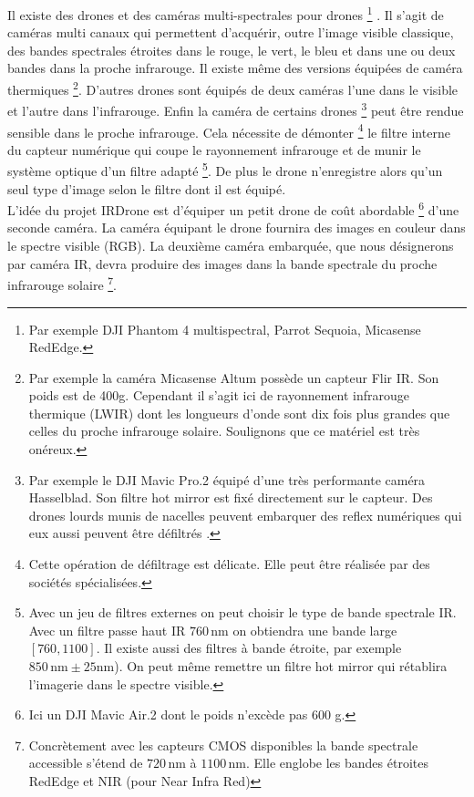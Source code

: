\documentclass[a4paper,11pt]{report}
\begin{document}
Il existe des drones et des caméras multi-spectrales pour drones
\footnote{Par exemple DJI Phantom 4 multispectral, Parrot Sequoia, Micasense RedEdge.} . 
Il s'agit de caméras multi canaux  qui permettent d'acquérir, outre l'image visible classique, des bandes spectrales étroites dans le rouge, le vert, le bleu et dans une ou deux bandes dans la proche infrarouge. Il existe même des versions équipées de caméra thermiques \footnote{Par exemple la caméra Micasense Altum  possède un capteur Flir IR. Son poids est de 400g. Cependant il s'agit ici de rayonnement infrarouge thermique (LWIR) dont les longueurs d'onde sont dix fois plus grandes que celles du  proche infrarouge solaire.  Soulignons que ce matériel est très onéreux.}.
D'autres drones
sont équipés de deux caméras l'une dans le visible et l'autre dans l'infrarouge. 
Enfin la caméra de certains drones
\footnote{Par exemple le DJI Mavic Pro.2 équipé d'une très performante caméra Hasselblad. Son filtre \og hot mirror\fg{} est fixé directement sur le capteur. Des drones \og lourds\fg{} munis de nacelles peuvent embarquer des reflex numériques qui eux aussi peuvent être \og défiltrés \fg{}. }  
peut être rendue sensible dans le proche infrarouge. Cela nécessite de démonter
\footnote{Cette opération de \og défiltrage \fg est délicate. Elle peut être réalisée par des sociétés spécialisées.} le filtre interne du capteur numérique qui coupe le rayonnement infrarouge et de munir le système optique d'un filtre adapté
\footnote{Avec un jeu de filtres externes on peut choisir le type de bande spectrale IR. Avec un filtre passe haut IR $760\,\mathrm{nm}$ on obtiendra une bande large $[760, 1100]$. Il existe aussi des filtres à bande étroite, par exemple $850\,\mathrm{nm}\pm 25\mathrm{nm}$). On peut même remettre un filtre \og hot mirror\fg{} qui rétablira l'imagerie dans le spectre visible.}.  
De plus le drone n'enregistre alors qu'un seul type d'image selon le filtre dont il est équipé. \\  


L'idée du projet \textsf{IRDrone} est d'équiper un petit  drone de coût abordable 
\footnote{Ici un DJI Mavic Air.2  dont le poids n'excède pas 600 g.} d'une seconde  caméra. La caméra équipant le drone fournira des images en couleur dans le spectre visible (RGB). La deuxième caméra embarquée, que nous désignerons par caméra IR, devra produire des images dans la bande spectrale du proche infrarouge \og solaire \fg 
\footnote{Concrètement avec les capteurs CMOS disponibles la bande spectrale accessible s'étend de $720 \,\mathrm{nm}$ à $1100\,\mathrm{nm}$. Elle englobe les bandes étroites RedEdge et NIR (pour Near Infra Red)}.\\
\end{document}
